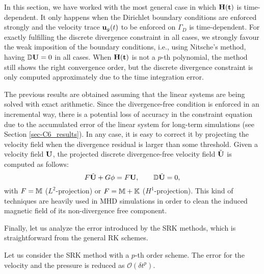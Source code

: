 \begin{remark}
In this section, we have worked with the most general case in which $\bf{H}(t)$ is time-dependent. It only happens when the Dirichlet boundary conditions are enforced strongly and the velocity trace ${\bf u}_g(t)$ to be enforced on $\Gamma_D$ is time-dependent. For exactly fulfilling the discrete divergence constraint in all cases, we strongly favour the weak imposition of the boundary conditions, i.e., using Nitsche's method, having $\mathbb{D}{\bf U} = 0$ in all cases. %
When $\bf{H}(t)$ is not a $p$-th polynomial, the method still shows the right convergence order, but the discrete divergence constraint is only computed approximately due to the time integration error.
\end{remark}

{
\begin{remark}
\label{remark3}
The previous results are obtained assuming that the linear systems are being solved with exact arithmetic. Since the divergence-free condition is enforced in an incremental way, there is a potential loss of accuracy in the constraint equation due to the accumulated error of the linear system for long-term simulations (see Section \ref{sec-C6_results}). In any case, it is easy to correct it by projecting the velocity field when the divergence residual is larger than some threshold. Given a velocity field ${\bf U}$, the projected discrete divergence-free velocity field $\tilde {{\bf U}}$ is computed as follows:
$$
F \tilde {{\bf U}} + G \phi = F {\bf U}, \qquad \mathbb{D} \tilde {{\bf U}} = 0,
$$
with $F = \mathbb{M}$ ($L^2$-projection) or $F = {\mathbb{M}}+\mathbb{K}$ ($H^1$-projection). This kind of techniques are heavily used in MHD simulations in order to clean the induced magnetic field of its non-divergence free component. 
\end{remark}}

Finally, let us analyze the error introduced by the SRK methods, which is straightforward from the general RK schemes.
\begin{proposition}
Let us consider the SRK method with a $p$-th order scheme. The error for the velocity and the pressure is reduced as $\mathcal{O}(\delta t^p)$. 
\end{proposition}

